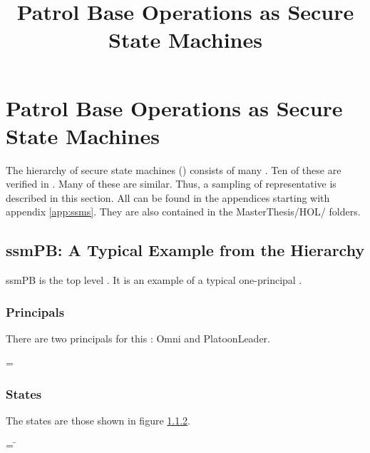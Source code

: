 \documentclass[../../main/main.tex]{subfiles}
\begin{document}
\title{Patrol Base Operations as Secure State Machines}


\chapter{Patrol Base Operations as Secure State Machines} \label{chp:pbssm}
The hierarchy of secure state machines () consists of many .  Ten of these  are verified in .  Many of these  are similar.  Thus, a sampling of representative  is described in this section.  All  can be found in the appendices starting with appendix \ref{app:ssms}.  They are also contained in the MasterThesis/HOL/ folders.

\section{ssmPB: A Typical Example from the Hierarchy}\label{sec:ssmpb}
ssmPB is the top level .  It is an example of a typical one-principal .

\subsection{Principals}
There are two principals for this : Omni and PlatoonLeader. 

 =  \HOLTokenBar{} 

\subsection{States}
The states are those shown in figure \ref{}.

\begin{tabbing}
 = \= \\
					\>\HOLTokenBar{}  \\
					\>\HOLTokenBar{}  \\
					\>\HOLTokenBar{} \\
        					\>\HOLTokenBar{}  \\
					\>\HOLTokenBar{} 
\end{tabbing}
\end{document}
